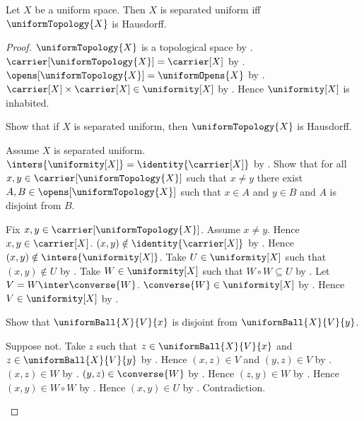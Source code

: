 \begin{theorem}\label{separated_uniform_iff_uniform_topology_hausdorff}
    Let $X$ be a uniform space.
    Then $X$ is separated uniform iff $\uniformTopology{X}$ is Hausdorff.
\end{theorem}
\begin{proof}
    $\uniformTopology{X}$ is a topological space
        by .
    $\carrier[\uniformTopology{X}]=\carrier[X]$
        by .
    $\opens[\uniformTopology{X}]=\uniformOpens{X}$
        by .
    $\carrier[X]\times\carrier[X]\in\uniformity[X]$
        by .
    Hence $\uniformity[X]$ is inhabited.

    Show that if $X$ is separated uniform, then
        $\uniformTopology{X}$ is Hausdorff.
    \begin{subproof}
        Assume $X$ is separated uniform.
        $\inters{\uniformity[X]}=\identity{\carrier[X]}$
            by .
        Show that for all $x,y\in\carrier[\uniformTopology{X}]$ such that
            $x\neq y$ there exist $A,B\in\opens[\uniformTopology{X}]$
            such that $x\in A$ and $y\in B$ and $A$ is disjoint from $B$.
        \begin{subproof}
            Fix $x,y\in\carrier[\uniformTopology{X}]$.
            Assume $x\neq y$.
            Hence $x,y\in\carrier[X]$.
            $(x,y)\notin\identity{\carrier[X]}$ by .
            Hence $(x,y)\notin\inters{\uniformity[X]}$.
            Take $U\in\uniformity[X]$ such that $(x,y)\notin U$
                by .
            Take $W\in\uniformity[X]$ such that $W\circ W\subseteq U$
                by .
            Let $V=W\inter\converse{W}$.
            $\converse{W}\in\uniformity[X]$ by .
            Hence $V\in\uniformity[X]$
                by .

            Show that $\uniformBall{X}{V}{x}$ is disjoint from
                $\uniformBall{X}{V}{y}$.
            \begin{subproof}
                Suppose not.
                Take $z$ such that $z\in\uniformBall{X}{V}{x}$ and
                    $z\in\uniformBall{X}{V}{y}$ by .
                Hence $(x,z)\in V$ and $(y,z)\in V$
                    by .
                $(x,z)\in W$ by .
                $(y,z)\in\converse{W}$ by .
                Hence $(z,y)\in W$ by .
                Hence $(x,y)\in W\circ W$ by .
                Hence $(x,y)\in U$ by .
                Contradiction.
            \end{subproof}


\end{subproof}
\end{subproof}
\end{proof}
